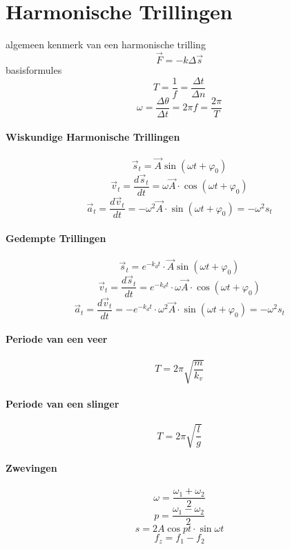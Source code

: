 \newpage
\section{Harmonische Trillingen}
\label{sec:HarmonischeTrillingen}
algemeen kenmerk van een harmonische trilling
\[ \vec{F} = -k \Delta\vec{s} \]
basisformules
\[ T = \frac{1}{f} = \frac{\Delta t}{\Delta n}\]
\[ \omega = \frac{\Delta \theta}{\Delta t} = 2\pi f = \frac{2\pi}{T} \]
\paragraph{Wiskundige Harmonische Trillingen}
\label{sec:WiskHarmonischeTrillingen}
\[ \vec{s}_t = \vec{A} \sin{\left(\omega t + \varphi_0\right)} \]
\[ \vec{v}_t = \frac{d\vec{s}_t}{dt} = \omega \vec{A} \cdot \cos\left(\omega t+ \varphi_0\right) \]
\[ \vec{a}_t = \frac{d\vec{v}_t}{dt} = - \omega^2 \vec{A} \cdot \sin\left(\omega t + \varphi_0\right) 
                                     = - \omega^2 s_t \]
\paragraph{Gedempte Trillingen}
\label{sec:GedempteTrillingen}
\[ \vec{s}_t = e^{-k_d t} \cdot \vec{A} \sin{\left(\omega t + \varphi_0\right)} \]
\[ \vec{v}_t = \frac{d\vec{s}_t}{dt} = e^{-k_d t} \cdot \omega \vec{A} \cdot \cos\left(\omega t+ \varphi_0\right) \]
\[ \vec{a}_t = \frac{d\vec{v}_t}{dt} = - e^{-k_d t} \cdot \omega^2 \vec{A} \cdot \sin\left(\omega t + \varphi_0\right) 
                                     = - \omega^2 s_t \]                                     
\paragraph{Periode van een veer}
\label{sec:PeriodeVanEenVeer}
\[ T = 2\pi\sqrt{\frac{m}{k_v}} \]
\paragraph{Periode van een slinger}
\label{sec:PeriodeVanEenSlinger}
\[ T = 2\pi\sqrt{\frac{l}{g}} \]

\paragraph{Zwevingen}
\label{sec:Zwevingen}
\[ \omega = \frac{\omega_1+\omega_2}{2}\]
\[ p = \frac{\omega_1-\omega_2}{2} \]
\[ s = 2A \cos pt \cdot \sin \omega t\]
\[ f_z = f_1 - f_2\]

